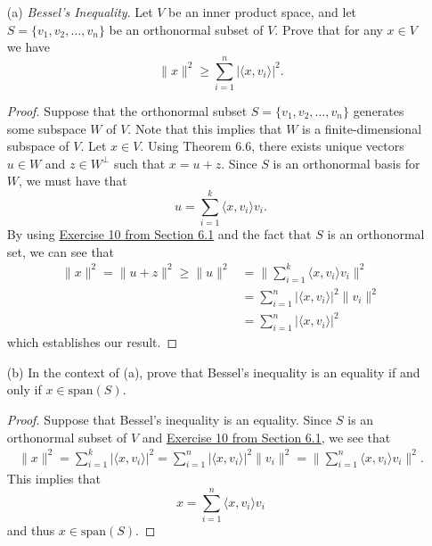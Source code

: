 \begin{enumerate}
    \item[(a)] \textit{Bessel's Inequality}. Let \( V  \) be an inner product space, and let \( S = \{ {v}_{1}, {v}_{2}, \dots, {v}_{n} \}  \) be an orthonormal subset of \( V  \). Prove that for any \( x \in V  \) we have 
        \[  \|x\|^{2} \geq \sum_{ i=1  }^{ n } | \langle x , {v}_{i} \rangle |^{2}. \]
        \begin{proof} Suppose that the orthonormal subset \( S = \{ {v}_{1}, {v}_{2}, \dots, {v}_{n} \}  \) generates some subspace \( W  \) of \( V  \). Note that this implies that \( W  \) is a finite-dimensional subspace of \( V  \). Let \( x \in V  \). Using Theorem 6.6, there exists unique vectors \( u \in W  \) and \( z \in W^{\perp} \) such that \( x = u + z  \). Since \( S  \) is an orthonormal basis for \( W  \), we must have that
            \[  u = \sum_{ i=1  }^{ k  } \langle  x ,  {v}_{i} \rangle {v}_{i}. \]
            By using {\hyperref[Exercise 6.1.10]{Exercise 10 from Section 6.1}} and the fact that \( S  \) is an orthonormal set, we can see that 
            \begin{align*}
                \|x\|^{2} = \|u + z\|^{2} \geq \|u\|^{2}  &= \Big\| \sum_{ i=1  }^{ k  } \langle x , {v}_{i} \rangle {v}_{i} \Big\|^{2} \\
                                          &= \sum_{ i=1  }^{ n  } | \langle x , {v}_{i} \rangle |^{2} \|{v}_{i}\|^{2} \\
                                          &= \sum_{ i=1 }^{ n  } | \langle x , {v}_{i} \rangle |^{2}
            \end{align*}
            which establishes our result.
        \end{proof}
    \item[(b)] In the context of (a), prove that Bessel's inequality is an equality if and only if \( x \in \text{span}(S) \).
        \begin{proof}
        Suppose that Bessel's inequality is an equality. Since \( S  \) is an orthonormal subset of \( V  \) and {\hyperref[Exercise 6.1.10]{Exercise 10 from Section 6.1}}, we see that
        \begin{align*}
            \|x\|^{2} = \sum_{ i=1  }^{ k  } | \langle x , {v}_{i} \rangle |^{2}   
                      = \sum_{ i=1  }^{ n  } | \langle x , {v}_{i} \rangle |^{2} \|{v}_{i}\|^{2} 
                      = \Big\| \sum_{ i=1  }^{ n  } \langle x , {v}_{i} \rangle {v}_{i} \Big\|^{2}.
        \end{align*}
        This implies that 
        \[  x = \sum_{ i=1  }^{ n  } \langle x , {v}_{i} \rangle {v}_{i} \]
        and thus \( x \in \text{span}(S) \). 


\end{proof}
\end{enumerate}
